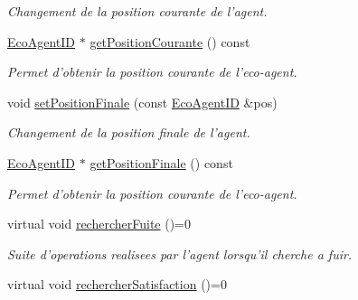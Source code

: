 \begin{CompactItemize}
\begin{CompactList}\small\item\em Changement de la position courante de l'agent. \item\end{CompactList}\item 
\hyperlink{classEcoAgentID}{EcoAgentID} $\ast$ \hyperlink{classEcoAgent_69b3c371f154303f30f3f948a31417f4}{getPositionCourante} () const 
\begin{CompactList}\small\item\em Permet d'obtenir la position courante de l'eco-agent. \item\end{CompactList}\item 
void \hyperlink{classEcoAgent_a0ffbb1fdb23fb5d8ad188e8f16d8c50}{setPositionFinale} (const \hyperlink{classEcoAgentID}{EcoAgentID} \&pos)
\begin{CompactList}\small\item\em Changement de la position finale de l'agent. \item\end{CompactList}\item 
\hyperlink{classEcoAgentID}{EcoAgentID} $\ast$ \hyperlink{classEcoAgent_f1aeed91b39191c6e73271062e6a97f4}{getPositionFinale} () const 
\begin{CompactList}\small\item\em Permet d'obtenir la position courante de l'eco-agent. \item\end{CompactList}\item 
\hypertarget{classEcoAgent_4b20031a336e8497412e3f5df4155e28}{
virtual void \hyperlink{classEcoAgent_4b20031a336e8497412e3f5df4155e28}{rechercherFuite} ()=0}
\label{classEcoAgent_4b20031a336e8497412e3f5df4155e28}

\begin{CompactList}\small\item\em Suite d'operations realisees par l'agent lorsqu'il cherche a fuir. \item\end{CompactList}\item 
\hypertarget{classEcoAgent_77119c5004b4c7555ad5eca0197eb805}{
virtual void \hyperlink{classEcoAgent_77119c5004b4c7555ad5eca0197eb805}{rechercherSatisfaction} ()=0}
\label{classEcoAgent_77119c5004b4c7555ad5eca0197eb805}


\end{CompactItemize}
